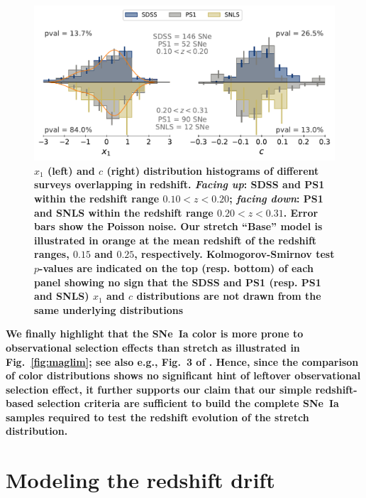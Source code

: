 \documentclass[]{aa}
\begin{document}
\begin{figure}
    \centering
    \includegraphics[width=0.95\linewidth]{Article_figures/both-cut_SDSS_SNLS_PS1.pdf}
    \caption{\textbf{$x_1$ (left) and $c$ (right) distribution histograms of
            different surveys overlapping in redshift. \textit{Facing up}: SDSS
            and PS1 within the redshift range $0.10 < z < 0.20$; \textit{facing
            down}: PS1 and SNLS within the redshift range $0.20 < z < 0.31$.
            Error bars show the Poisson noise. Our stretch ``Base'' model is
            illustrated in orange at the mean redshift of the redshift ranges,
            $0.15$ and $0.25$, respectively. Kolmogorov-Smirnov test $p$-values
            are indicated on the top (resp. bottom) of each panel showing no
            sign that the SDSS and PS1 (resp. PS1 and SNLS) $x_1$ and $c$
            distributions are not drawn from the same underlying
    distributions}}
    \label{fig:distrib}
\end{figure}

\textbf{We finally highlight that the SNe~Ia color is more prone to
    observational selection effects than stretch as illustrated in
    Fig.~\ref{fig:maglim}; see also e.g., Fig.~3 of \cite{kessler2017}. Hence,
    since the comparison of color distributions shows no significant hint of
    leftover observational selection effect, it further supports our claim that
    our simple redshift-based selection criteria are sufficient to build the
    complete SNe~Ia samples required to test the redshift evolution of the
stretch distribution.}

\section{Modeling the redshift drift}\label{sec:modeling}
\end{document}
